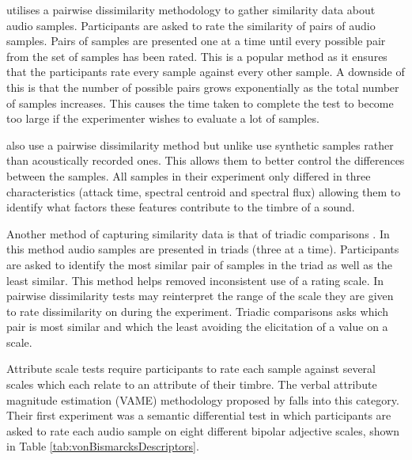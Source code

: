 		\citet{grey1977multidimensional} utilises a pairwise dissimilarity methodology to gather similarity data
		about audio samples.  Participants are asked to rate the similarity of pairs of audio samples. Pairs of
		samples are presented one at a time until every possible pair from the set of samples has been rated. This
		is a popular method as it ensures that the participants rate every sample against every other sample. A
		downside of this is that the number of possible pairs grows exponentially as the total number of samples
		increases. This causes the time taken to complete the test to become too large if the experimenter wishes to
		evaluate a lot of samples.

		\citet{caclin2005acoustic} also use a pairwise dissimilarity method but unlike
		\citet{grey1977multidimensional} use synthetic samples rather than acoustically recorded ones. This allows
		them to better control the differences between the samples. All samples in their experiment only differed in
		three characteristics (attack time, spectral centroid and spectral flux) allowing them to identify what
		factors these features contribute to the timbre of a sound.

		Another method of capturing similarity data is that of triadic comparisons \citep{wickelmaier2007deriving}.
		In this method audio samples are presented in triads (three at a time).  Participants are asked to identify
		the most similar pair of samples in the triad as well as the least similar. This method helps removed
		inconsistent use of a rating scale. In pairwise dissimilarity tests may reinterpret the range of the scale
		they are given to rate dissimilarity on during the experiment. Triadic comparisons asks which pair is most
		similar and which the least avoiding the elicitation of a value on a scale.

		Attribute scale tests require participants to rate each sample against several scales which each relate to
		an attribute of their timbre. The verbal attribute magnitude estimation (VAME) methodology proposed by
		\citet{kendal1993verbal1} falls into this category. Their first experiment was a semantic differential test
		in which participants are asked to rate each audio sample on eight different bipolar adjective scales, shown
		in Table \ref{tab:vonBismarcksDescriptors}.

